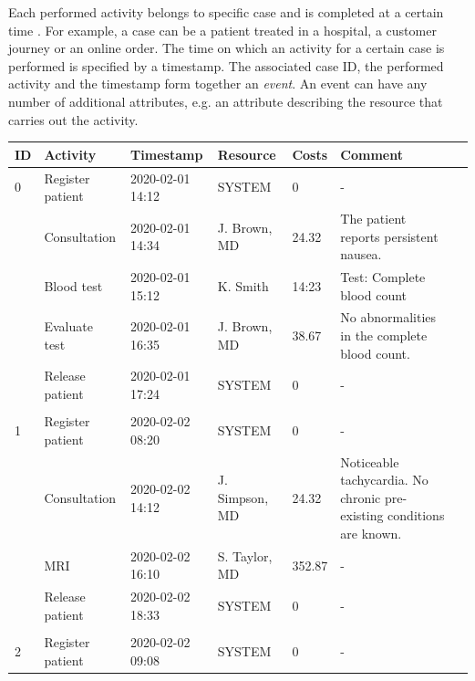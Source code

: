 Each performed activity belongs to specific case and is completed at a certain time \cite{DBLP:conf/bpm/AalstAM11}.
For example, a case can be a patient treated in a hospital, a customer journey or an online order.
The time on which an activity for a certain case is performed is specified by a timestamp.
The associated case ID, the performed activity and the timestamp form together an \textit{event}.
An event can have any number of additional attributes, e.g. an attribute describing the resource that carries out the activity.
\begin{table}[htbp!]
	\small
	\setlength\tabcolsep{3pt}
	\begin{tabularx}{\textwidth}{lllllp{4.7cm}l}
		\toprule
		\textbf{ID} & \textbf{Activity}          & \textbf{Timestamp} & \textbf{Resource} & \textbf{Costs} & \textbf{Comment}  \\
		\midrule
		0                & Register patient           & 2020-02-01 14:12   & SYSTEM            & 0             & -     \\
		& Consultation               & 2020-02-01 14:34   & J. Brown, MD    & 24.32         & The patient reports persistent nausea.   \\
		& Blood test                 & 2020-02-01 15:12   & K. Smith         & 14:23         & Test: Complete blood count    \\
		& Evaluate test  & 2020-02-01 16:35   & J. Brown, MD    & 38.67         &No abnormalities in the complete blood count.   \\
		& Release patient            & 2020-02-01 17:24   & SYSTEM            & 0             & -  \\
		&                            &                    &                   &               &     \\
		\midrule
		1                & Register patient           & 2020-02-02 08:20   & SYSTEM            & 0             & -  \\
		& Consultation               & 2020-02-02 14:12   & J. Simpson, MD  & 24.32         & Noticeable tachycardia. No chronic pre-existing conditions are known.    \\
		& MRI & 2020-02-02 16:10   & S. Taylor, MD   & 352.87        & -    \\
		& Release patient            & 2020-02-02 18:33   & SYSTEM            & 0             & -   \\
		&                            &                    &                   &               &     \\
		\midrule
		2                & Register patient           & 2020-02-02 09:08   & SYSTEM            & 0             & -    \\

\end{tabularx}
\end{table}
